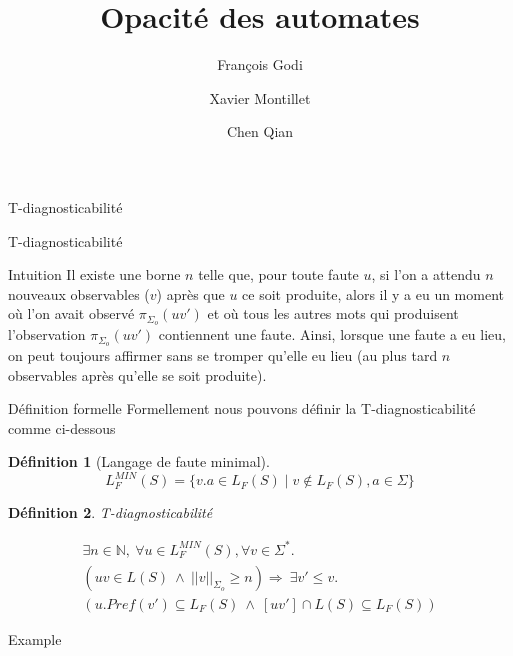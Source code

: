 \documentclass[11pt]{beamer}
\author{François Godi \and Xavier Montillet \and Chen Qian}
\title{Opacit\'e des automates}
\newtheorem{mydef}{D\'efinition}
\begin{document}
\begin{frame}
\titlepage
\end{frame}

\begin{frame}
\tableofcontents
\end{frame}

\begin{section}{T-diagnosticabilit\'e}

  \begin{frame}{T-diagnosticabilit\'e}
    \begin{block}{Intuition}
      Il existe une borne $n$ telle que, pour toute faute $u$, si l'on a attendu $n$ nouveaux observables ($v$) après que $u$ ce soit produite, alors il y a eu un moment où l'on avait observé $\pi_{\Sigma_o}(uv')$ et où tous les autres mots qui produisent l'observation $\pi_{\Sigma_o}(uv')$ contiennent une faute. Ainsi, lorsque une faute a eu lieu, on peut toujours affirmer sans se tromper qu'elle eu lieu (au plus tard $n$ observables après qu'elle se soit produite).
    \end{block}
  \end{frame}

  \begin{frame}{D\'efinition formelle}
    Formellement nous pouvons d\'efinir la T-diagnosticabilit\'e comme ci-dessous

    \begin{mydef}[Langage de faute minimal]

      $$L_{F}^{MIN}(S) =  \{v.a \in L_F(S) \mid v\not \in L_F(S), a\in \Sigma \} $$
    \end{mydef}
    
    \begin{mydef}{T-diagnosticabilité}
      
      $$
      \begin{array}{l}
        \exists n \in \mathbb{N}, \ \forall u \in L^{MIN}_F(S), \forall v \in \Sigma^*.\\
        (uv \in L(S) \ \wedge \  ||v||_{\Sigma_o}\geq n) \Rightarrow \ \exists v' \leq v. \\
(u.Pref(v') \subseteq L_F(S) \ \wedge \  [uv'] \cap L(S) \subseteq L_F(S))
      \end{array}
      $$

    \end{mydef}
    
  \end{frame}

  \begin{frame}{Example}
    

\end{frame}
\end{section}
\end{document}

